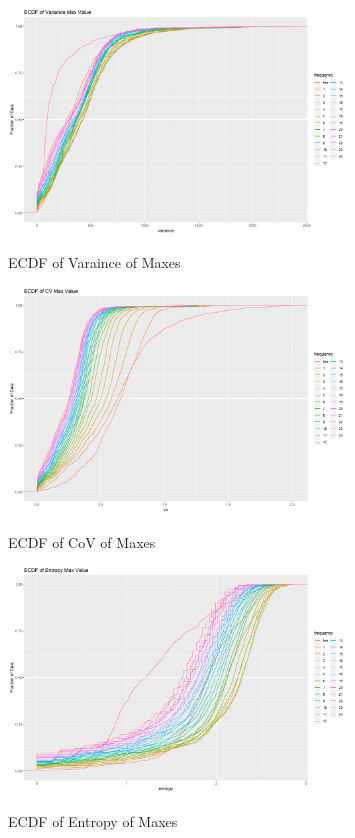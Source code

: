 \documentclass{article}
\begin{document}
\begin{figure}[htbp]
\caption{ECDF of Varaince of Maxes}
\centering
\includegraphics[width = 0.8\textwidth]{ECDFofVarianceMaxValue}
\label{fig:fig1.1.1}
\end{figure}

\begin{figure}[htbp]
\caption{ECDF of CoV of Maxes}
\centering
\includegraphics[width = 0.8\textwidth]{ECDFofCVMaxValue}
\label{fig:fig1.1.2}
\end{figure}

\begin{figure}[htbp]
\caption{ECDF of Entropy of Maxes}
\centering
\includegraphics[width = 0.8\textwidth]{ECDFofEntropyMaxValue}
\label{fig:fig1.1.3}
\end{figure}
\end{document}
